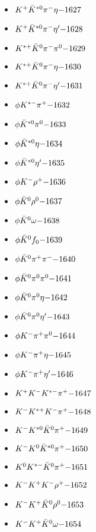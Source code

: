 \begin{multicols}{3}
\begin{itemize}
 \item $ K^{+} \bar{K}^{*0} \pi^{-} \eta \hfill{-1627}$
 \item $ K^{+} \bar{K}^{*0} \pi^{-} {\eta^{\prime}} \hfill{-1628}$
 \item $ K^{*+} \bar{K}^{0} \pi^{-} \pi^{0} \hfill{-1629}$
 \item $ K^{*+} \bar{K}^{0} \pi^{-} \eta \hfill{-1630}$
 \item $ K^{*+} \bar{K}^{0} \pi^{-} {\eta^{\prime}} \hfill{-1631}$
 \item $ \phi K^{*-} \pi^{+} \hfill{-1632}$
 \item $ \phi \bar{K}^{*0} \pi^{0} \hfill{-1633}$
 \item $ \phi \bar{K}^{*0} \eta \hfill{-1634}$
 \item $ \phi \bar{K}^{*0} {\eta^{\prime}} \hfill{-1635}$
 \item $ \phi K^{-} \rho^{+} \hfill{-1636}$
 \item $ \phi \bar{K}^{0} \rho^{0} \hfill{-1637}$
 \item $ \phi \bar{K}^{0} \omega \hfill{-1638}$
 \item $ \phi \bar{K}^{0} f_{0} \hfill{-1639}$
 \item $ \phi \bar{K}^{0} \pi^{+} \pi^{-} \hfill{-1640}$
 \item $ \phi \bar{K}^{0} \pi^{0} \pi^{0} \hfill{-1641}$
 \item $ \phi \bar{K}^{0} \pi^{0} \eta \hfill{-1642}$
 \item $ \phi \bar{K}^{0} \pi^{0} {\eta^{\prime}} \hfill{-1643}$
 \item $ \phi K^{-} \pi^{+} \pi^{0} \hfill{-1644}$
 \item $ \phi K^{-} \pi^{+} \eta \hfill{-1645}$
 \item $ \phi K^{-} \pi^{+} {\eta^{\prime}} \hfill{-1646}$
 \item $ K^{+} K^{-} K^{*-} \pi^{+} \hfill{-1647}$
 \item $ K^{-} K^{*+} K^{-} \pi^{+} \hfill{-1648}$
 \item $ K^{-} K^{*0} \bar{K}^{0} \pi^{+} \hfill{-1649}$
 \item $ K^{-} K^{0} \bar{K}^{*0} \pi^{+} \hfill{-1650}$
 \item $ K^{0} K^{*-} \bar{K}^{0} \pi^{+} \hfill{-1651}$
 \item $ K^{-} K^{+} K^{-} \rho^{+} \hfill{-1652}$
 \item $ K^{-} K^{+} \bar{K}^{0} \rho^{0} \hfill{-1653}$
 \item $ K^{-} K^{+} \bar{K}^{0} \omega \hfill{-1654}$

\end{itemize}
\end{multicols}
